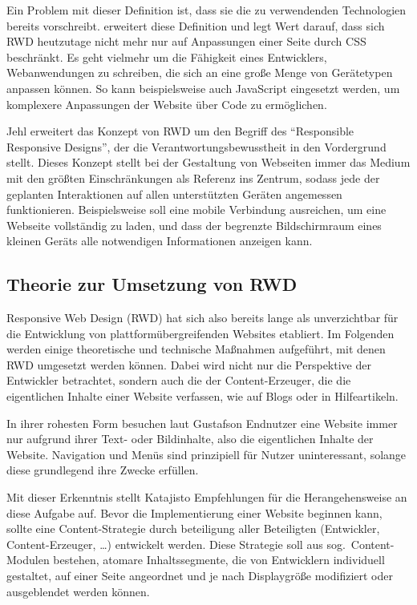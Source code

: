 Ein Problem mit dieser Definition ist, dass sie die zu verwendenden Technologien bereits vorschreibt.
\autocite[S. 28]{Laati.ImplementingResponsiveDesignInIndustrialDashboardEditor.2017} erweitert diese Definition und legt Wert darauf, dass sich RWD heutzutage nicht mehr nur auf Anpassungen einer Seite durch CSS beschränkt.
Es geht vielmehr um die Fähigkeit eines Entwicklers, Webanwendungen zu schreiben, die sich an eine große Menge von Gerätetypen anpassen können.
So kann beispielsweise auch JavaScript eingesetzt werden, um komplexere Anpassungen der Website über Code zu ermöglichen.

Jehl \autocite{Jehl.ResponsibleResponsiveWebDesign.2014} erweitert das Konzept von RWD um den Begriff des "`Responsible Responsive Designs"', der die Verantwortungsbewusstheit in den Vordergrund stellt.
Dieses Konzept stellt bei der Gestaltung von Webseiten immer das Medium mit den größten Einschränkungen als Referenz ins Zentrum, sodass jede der geplanten Interaktionen auf allen unterstützten Geräten angemessen funktionieren.
Beispielsweise soll eine mobile Verbindung ausreichen, um eine Webseite vollständig zu laden, und dass der begrenzte Bildschirmraum eines kleinen Geräts alle notwendigen Informationen anzeigen kann.


\subsection{Theorie zur Umsetzung von RWD}

Responsive Web Design (RWD) hat sich also bereits lange als unverzichtbar für die Entwicklung von plattformübergreifenden Websites etabliert.
Im Folgenden werden einige theoretische und technische Maßnahmen aufgeführt, mit denen RWD umgesetzt werden können.
Dabei wird nicht nur die Perspektive der Entwickler betrachtet, sondern auch die der Content-Erzeuger, die die eigentlichen Inhalte einer Website verfassen, wie auf Blogs oder in Hilfeartikeln.

In ihrer rohesten Form besuchen laut Gustafson \autocite[Kap. 1]{Gustafson.AdaptiveWebDesign.2011} Endnutzer eine Website immer nur aufgrund ihrer Text- oder Bildinhalte, also die eigentlichen Inhalte der Website.
Navigation und Menüs sind prinzipiell für Nutzer uninteressant, solange diese grundlegend ihre Zwecke erfüllen.

Mit dieser Erkenntnis stellt Katajisto \autocite[S. 4]{Katajisto.CreatingSupportContent.2015} Empfehlungen für die Herangehensweise an diese Aufgabe auf.
Bevor die Implementierung einer Website beginnen kann, sollte eine Content-Strategie durch beteiligung aller Beteiligten (Entwickler, Content-Erzeuger, \ldots) entwickelt werden.
Diese Strategie soll aus sog.\ Content-Modulen bestehen, atomare Inhaltssegmente, die von Entwicklern individuell gestaltet, auf einer Seite angeordnet und je nach Displaygröße modifiziert oder ausgeblendet werden können.

